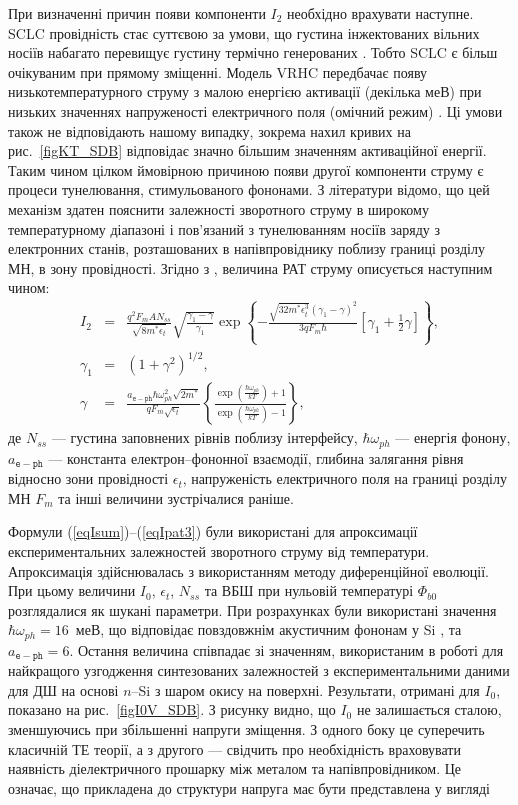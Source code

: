 При визначенні причин появи компоненти $I_2$ необхідно врахувати наступне.
SCLC провідність стає суттєвою за умови, що густина інжектованих вільних носіїв
набагато перевищує густину термічно генерованих \cite{Jafar}.
Тобто SCLC є більш очікуваним при прямому зміщенні.
Модель VRHC передбачає появу низькотемпературного струму з малою енергією активації (декілька меВ) при
низьких значеннях напруженості електричного поля (омічний режим) \cite{Jafar}.
Ці умови також не відповідають нашому випадку, зокрема нахил кривих на рис.~\ref{figKT_SDB} відповідає значно більшим значенням
активаційної енергії.
Таким чином цілком ймовірною причиною появи другої компоненти струму є процеси тунелювання, стимульованого фононами.
З літератури \cite{Pipinys1999,Pipinys2006,PipinsFTP} відомо, що цей механізм здатен пояснити залежності
зворотного струму в широкому температурному діапазоні і пов'язаний з тунелюванням
 носіїв заряду з електронних станів, розташованих в напівпровіднику поблизу границі розділу МН, в зону провідності.
Згідно з \cite{Pipinys2006,Kiveris}, величина РАТ струму описується наступним чином:
\begin{eqnarray}
\label{eqIpat}
 I_{2}&=&\frac{q^2F_mAN_{ss}}{\sqrt{8m^*\epsilon_t}}\sqrt{\frac{\gamma_1-\gamma}{\gamma_1}}\exp
    \left\{-\frac{\sqrt{32m^*\epsilon_t^3}\left(\gamma_1-\gamma\right)^2}{3qF_m\hbar}
    [\gamma_1+\frac{1}{2}\gamma]\right\}, \\
    \gamma_1&=&(1+\gamma^2)^{1/2},\\
\label{eqIpat3}
    \gamma&=&\frac{a_\mathtt{e-ph}\hbar\omega_{ph}^2\sqrt{2m^*}}{qF_m\sqrt{\epsilon_t}}
    \left\{\frac{\exp\left(\frac{\hbar\omega_{ph}}{kT}\right)+1}{\exp\left(\frac{\hbar\omega_{ph}}{kT}\right)-1}\right\},
\end{eqnarray}
де
$N_{ss}$ --- густина заповнених рівнів поблизу інтерфейсу,
$\hbar\omega_{ph}$ --- енергія фонону,
$a_\mathtt{e-ph}$ --- константа електрон--фононної взаємодії,
глибина залягання рівня відносно зони провідності $\epsilon_t$,
напруженість електричного поля на границі розділу МН $F_m$ та інші величини зустрічалися раніше.

Формули (\ref{eqIsum})--(\ref{eqIpat3}) були використані для апроксимації експериментальних залежностей зворотного струму від температури.
Апроксимація здійснювалась з використанням методу диференційної еволюції.
При цьому величини $I_0$, $\epsilon_t$, $N_{ss}$ та ВБШ при нульовій температурі $\Phi_{b0}$ розглядалися як шукані параметри.
При розрахунках були використані значення $\hbar\omega_{ph}=16$~меВ, що відповідає повздовжнім акустичним фононам у Si \cite[с.~312]{ShalimovaBook},
та $a_\mathtt{e-ph}=6$.
Остання величина співпадає зі значенням, використаним в роботі \cite{PipinsFTP} для найкращого узгодження синтезованих залежностей з експериментальними даними для ДШ на основі $n$--Si з шаром окису на поверхні.
Результати, отримані для $I_0$, показано на рис.~\ref{figI0V_SDB}.
З рисунку видно, що $I_0$ не залишається сталою, зменшуючись при збільшенні напруги зміщення.
З одного боку це суперечить класичній ТЕ теорії, а з другого --- свідчить
про необхідність враховувати наявність діелектричного прошарку між металом та напівпровідником.
Це означає, що
прикладена до структури напруга має бути представлена у вигляді



